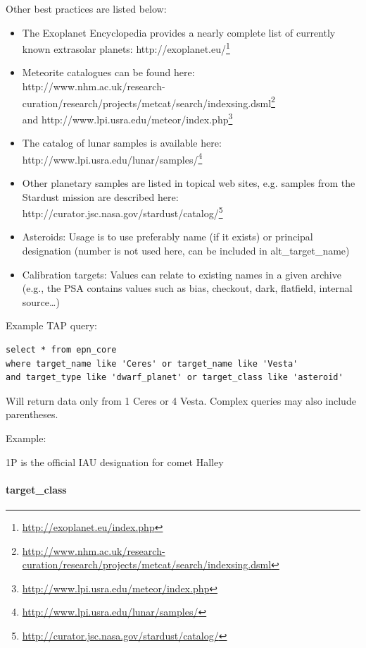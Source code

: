 \documentclass[11pt,a4paper]{ivoa}
\begin{document}
Other best practices are listed below:

\begin{itemize}
\item The Exoplanet Encyclopedia provides a nearly complete list of currently known extrasolar planets: http://exoplanet.eu/\footnote{\url{http://exoplanet.eu/index.php}}
\item Meteorite catalogues can be found here: \\http://www.nhm.ac.uk/research-curation/research/projects/metcat/search/indexsing.dsml\footnote{\url{http://www.nhm.ac.uk/research-curation/research/projects/metcat/search/indexsing.dsml}} \\and http://www.lpi.usra.edu/meteor/index.php\footnote{\url{http://www.lpi.usra.edu/meteor/index.php}}
\item The catalog of lunar samples is available here: http://www.lpi.usra.edu/lunar/samples/\footnote{\url{http://www.lpi.usra.edu/lunar/samples/}}
\item Other planetary samples are listed in topical web sites, e.g. samples from the Stardust mission are described here: \\http://curator.jsc.nasa.gov/stardust/catalog/\footnote{\url{http://curator.jsc.nasa.gov/stardust/catalog/}}
\item Asteroids: Usage is to use preferably name (if it exists) or principal designation (number is not used here, can be included in alt\_target\_name)
\item Calibration targets: Values can relate to existing names in a given archive (e.g., the PSA contains values such as bias, checkout, dark, flatfield, internal source…)
\end{itemize}

Example TAP query:

\begin{verbatim}
select * from epn_core 
where target_name like 'Ceres' or target_name like 'Vesta' 
and target_type like 'dwarf_planet' or target_class like 'asteroid'
\end{verbatim}

Will return data only from 1 Ceres or 4 Vesta. Complex queries may also include parentheses.


Example:

1P is the official IAU designation for comet Halley

\paragraph{target\_class}
\end{document}
